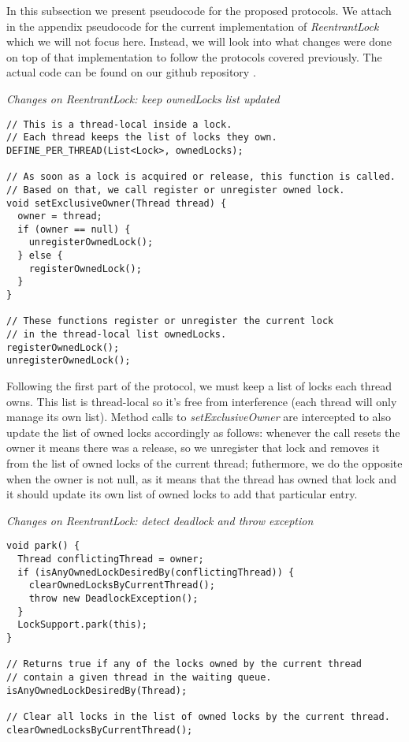 In this subsection we present pseudocode for the proposed protocols. We attach in the appendix pseudocode for the current implementation of \emph{ReentrantLock} which we will not focus here. Instead, we will look into what changes were done on top of that implementation to follow the protocols covered previously. The actual code can be found on our github repository \cite{repo}.

\medskip
\noindent
{\it Changes on ReentrantLock: keep ownedLocks list updated}
\begin{verbatim}
// This is a thread-local inside a lock.
// Each thread keeps the list of locks they own.
DEFINE_PER_THREAD(List<Lock>, ownedLocks);

// As soon as a lock is acquired or release, this function is called.
// Based on that, we call register or unregister owned lock.
void setExclusiveOwner(Thread thread) {
  owner = thread;
  if (owner == null) {
    unregisterOwnedLock();
  } else {
    registerOwnedLock();
  }
}

// These functions register or unregister the current lock
// in the thread-local list ownedLocks.
registerOwnedLock();
unregisterOwnedLock();
\end{verbatim}

Following the first part of the protocol, we must keep a list of locks each thread owns.
This list is thread-local so it's free from interference (each thread will only manage its own list). Method calls to \emph{setExclusiveOwner} are intercepted to also update the list of owned locks accordingly as follows: whenever the call resets the owner it means there was a release, so we unregister that lock and removes it from the list of owned locks of the current thread; futhermore, we do the opposite when the owner is not null, as it means that the thread has owned that lock and it should update its own list of owned locks to add that particular entry.

\medskip
\noindent
{\it Changes on ReentrantLock: detect deadlock and throw exception}
\begin{verbatim}
void park() {
  Thread conflictingThread = owner;
  if (isAnyOwnedLockDesiredBy(conflictingThread)) {
    clearOwnedLocksByCurrentThread();
    throw new DeadlockException();
  }
  LockSupport.park(this);
}

// Returns true if any of the locks owned by the current thread
// contain a given thread in the waiting queue.
isAnyOwnedLockDesiredBy(Thread);

// Clear all locks in the list of owned locks by the current thread.
clearOwnedLocksByCurrentThread();
\end{verbatim}

